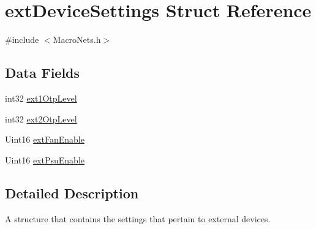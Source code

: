 \hypertarget{a00005}{\section{ext\-Device\-Settings Struct Reference}
\label{a00005}
}


{\ttfamily \#include $<$Macro\-Nets.\-h$>$}

\subsection*{Data Fields}
\begin{DoxyCompactItemize}
\item 
int32 \hyperlink{a00005_a7cf62224e015e717460215641dc3e93e}{ext1\-Otp\-Level}
\item 
int32 \hyperlink{a00005_aa4bded0306eb752974a7f60cf87f24b2}{ext2\-Otp\-Level}
\item 
Uint16 \hyperlink{a00005_a32ea51e444d99ee6231d10519650daec}{ext\-Fan\-Enable}
\item 
Uint16 \hyperlink{a00005_a35d06fe7472dbf3f7b2505e86337c497}{ext\-Psu\-Enable}
\end{DoxyCompactItemize}


\subsection{Detailed Description}
A structure that contains the settings that pertain to external devices. 


